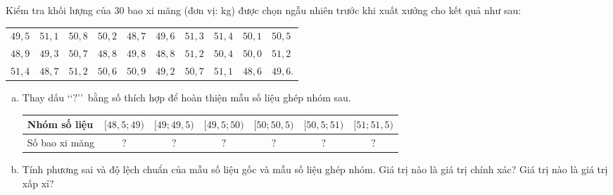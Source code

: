 \begin{bt}%

	Kiểm tra khối lượng của $30$ bao xi măng (đơn vị: kg) được chọn ngẫu nhiên trước khi xuất xưởng cho kết quả như sau:
\begin{center}
		\begin{tabular}{llllllllll}
		$49{,}5$ & $51{,}1$ & $50{,}8$ & $50{,}2$ & $48{,}7$ & $49{,}6$ & $51{,}3$ & $51{,}4$ & $50{,}1$ & $50{,}5$ \\
		$48{,}9$ & $49{,}3$ & $50{,}7$ & $48{,}8$ & $49{,}8$ & $48{,}8$ & $51{,}2$ & $50{,}4$ & $50{,}0$ & $51{,}2$ \\
		$51{,}4$ & $48{,}7$ & $51{,}2$ & $50{,}6$ & $50{,}9$ & $49{,}2$ & $50{,}7$ & $51{,}1$ & $48{,}6$ & $49{,}6$.
	\end{tabular}
\end{center}	
	\begin{enumerate}[a)]
		\item Thay dấu \lq\lq $?$\rq\rq ~bằng số thích hợp để hoàn thiện mẫu số liệu ghép nhóm sau.
		\begin{center}
			\begin{tabular}{|l|c|c|c|c|c|c|}
				\hline Nhóm số liệu & {$[48{,}5; 49)$} & {$[49; 49{,}5)$} & {$[49{,}5; 50)$} & {$[50 ; 50{,}5)$} & {$[50{,}5 ; 51)$} & {$[51 ; 51{,}5)$} \\
				\hline Số bao xi măng & $?$ & $?$ & $?$ & $?$ & $?$ & $?$ \\
				\hline
			\end{tabular}
		\end{center}
	\item Tính phương sai và độ lệch chuẩn của mẫu số liệu gốc và mẫu số liệu ghép nhóm. Giá trị nào là giá trị chính xác? Giá trị nào là giá trị xấp xỉ?
	\end{enumerate}
\loigiai{
	\begin{enumerate}[a)]
		\item 
	\begin{center}
		\begin{tabular}{|l|c|c|c|c|c|c|}
			\hline Nhóm số liệu & {$[48{,}5; 49)$} & {$[49; 49{,}5)$} & {$[49{,}5; 50)$} & {$[50 ; 50{,}5)$} & {$[50{,}5; 51)$} & {$[51; 51{,}5)$} \\
			\hline Số bao xi măng & $6$ & $2$ & $4$ & $4$ & $6$ & $8$ \\

\end{tabular}
\end{center}
\end{enumerate}}
\end{bt}
